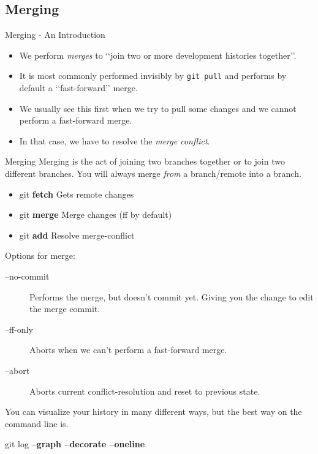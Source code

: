 \documentclass{beamer}
\begin{document}
\subsection{Merging}
\begin{frame}[fragile]{Merging - An Introduction}
  \begin{itemize}
    \item We perform \textit{merges} to \lq\lq{}join two or more development histories together\rq\rq{}.
    \item It is most commonly performed invisibly by \texttt{git pull} and performs by default a \lq\lq{}fast-forward\rq\rq{} merge.
    \item We usually see this first when we try to pull some changes and we cannot perform a fast-forward merge.
    \item In that case, we have to resolve the \textit{merge conflict}.
  \end{itemize}
\end{frame}

\begin{frame}[fragile]{Merging}
Merging is the act of joining two branches together or to join two different branches. You will always merge \emph{from} a branch/remote into a branch.
  \begin{block}{}
    \begin{itemize}
      \item git \textbf{fetch}  Gets remote changes
      \item git \textbf{merge}  Merge changes (ff by default)
      \item git \textbf{add}    Resolve merge-conflict
    \end{itemize}

    Options for merge:
    \begin{description}
      \item[--no-commit] Performs the merge, but doesn't commit yet. Giving you the change to edit the merge commit.
      \item[--ff-only]   Aborts when we can't perform a fast-forward merge.
      \item[--abort]     Aborts current conflict-resolution and reset to previous state.
    \end{description}
  \end{block}

  You can visualize your history in many different ways, but the best way on the command line is.\\
  \begin{block}{}
  git log \textbf{--graph --decorate --oneline}
  \end{block}
\end{frame}
\end{document}
